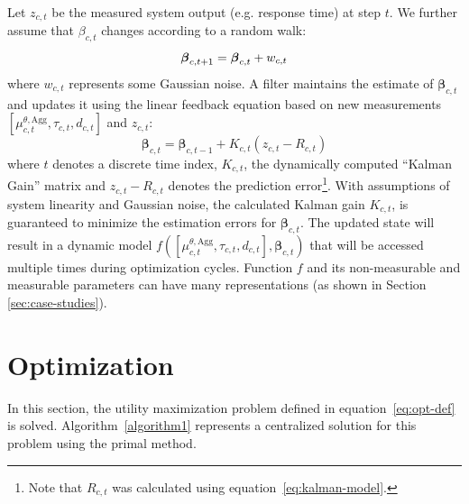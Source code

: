 Let $z_{c,t}$ be the measured system output (e.g. response time) at step $t$. 
We further assume that $\beta_{c,t}$ changes according to a random walk:
\begin{equation}
	\boldsymbol\beta_{c,t+1}=\boldsymbol\beta_{c,t}+w_{c,t} \\
\end{equation}
where $w_{c,t}$ represents some Gaussian noise.
A filter maintains the estimate of $\boldsymbol\beta_{c,t}$ and updates it using the linear feedback equation based on new measurements $\left[\mu^{\theta,\text{Agg}}_{c,t},\tau_{c,t},d_{c,t}\right]$ and $z_{c,t}$: 
\begin{equation}\label{eq:kalman-update} 
	\boldsymbol\beta_{c,t} = \boldsymbol\beta_{c,t-1}+ K_{c,t}(z_{c,t} - R_{c,t})
\end{equation}
where $t$ denotes a discrete time index, $K_{c,t}$, the dynamically computed
``Kalman Gain'' matrix and $z_{c,t}-R_{c,t}$ denotes the prediction error\footnote{Note that $R_{c,t}$ was calculated using equation~\ref{eq:kalman-model}.}. With assumptions of system linearity and Gaussian noise, the calculated Kalman gain $K_{c,t}$, is guaranteed to minimize the 
estimation errors for $\boldsymbol\beta_{c,t}$. The updated state will result in a dynamic
model $f(\left[\mu^{\theta,\text{Agg}}_{c,t},\tau_{c,t},d_{c,t}\right],\boldsymbol\beta_{c,t})$ that will be accessed multiple times during optimization cycles. 
Function $f$ and its non-measurable and  measurable parameters can have many representations (as shown in Section \ref{sec:case-studies}). 

\section{Optimization}
\label{sec:optimization-through-subgradient}
In this section, the utility maximization problem defined in equation~\ref{eq:opt-def} is solved. Algorithm~\ref{algorithm1} represents a centralized solution for this problem using the primal method.  

